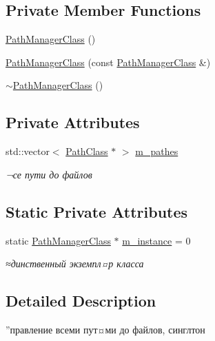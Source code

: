 \subsection*{Private Member Functions}
\begin{DoxyCompactItemize}
\item 
\hyperlink{class_path_manager_class_a2865245187fa1b0daea3defe90eb00ff}{Path\+Manager\+Class} ()
\item 
\hyperlink{class_path_manager_class_ac448d59923742fecd177850d8b00d026}{Path\+Manager\+Class} (const \hyperlink{class_path_manager_class}{Path\+Manager\+Class} \&)
\item 
\hyperlink{class_path_manager_class_a814e9c112d158cc6096fb69c7be4413e}{$\sim$\+Path\+Manager\+Class} ()
\end{DoxyCompactItemize}
\subsection*{Private Attributes}
\begin{DoxyCompactItemize}
\item 
std\+::vector$<$ \hyperlink{class_path_class}{Path\+Class} $\ast$ $>$ \hyperlink{class_path_manager_class_a1648b63352c73698ed7435aa663ac071}{m\+\_\+pathes}
\begin{DoxyCompactList}\small\item\em ¬се пути до файлов \end{DoxyCompactList}\end{DoxyCompactItemize}
\subsection*{Static Private Attributes}
\begin{DoxyCompactItemize}
\item 
static \hyperlink{class_path_manager_class}{Path\+Manager\+Class} $\ast$ \hyperlink{class_path_manager_class_a7712e855307df9fee875a5ed8eac9bd6}{m\+\_\+instance} = 0
\begin{DoxyCompactList}\small\item\em ≈динственный экземпл¤р класса \end{DoxyCompactList}\end{DoxyCompactItemize}


\subsection{Detailed Description}
”правление всеми пут¤ми до файлов, синглтон 

